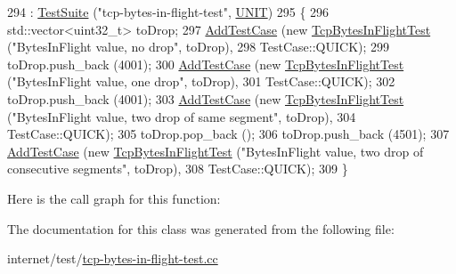 \begin{DoxyCode}
294                                : \hyperlink{classns3_1_1TestSuite_a904b0c40583b744d30908aeb94636d1a}{TestSuite} (\textcolor{stringliteral}{"tcp-bytes-in-flight-test"}, 
      \hyperlink{classns3_1_1TestSuite_a1ebfcab34ec8161e085e8e3a1855eae0a3885375a3787abf60431f8454b3cadbd}{UNIT})
295   \{
296     std::vector<uint32\_t> toDrop;
297     \hyperlink{classns3_1_1TestCase_a3718088e3eefd5d6454569d2e0ddd835}{AddTestCase} (\textcolor{keyword}{new} \hyperlink{classTcpBytesInFlightTest}{TcpBytesInFlightTest} (\textcolor{stringliteral}{"BytesInFlight value, no drop"}, 
      toDrop),
298                  TestCase::QUICK);
299     toDrop.push\_back (4001);
300     \hyperlink{classns3_1_1TestCase_a3718088e3eefd5d6454569d2e0ddd835}{AddTestCase} (\textcolor{keyword}{new} \hyperlink{classTcpBytesInFlightTest}{TcpBytesInFlightTest} (\textcolor{stringliteral}{"BytesInFlight value, one drop"}, 
      toDrop),
301                  TestCase::QUICK);
302     toDrop.push\_back (4001);
303     \hyperlink{classns3_1_1TestCase_a3718088e3eefd5d6454569d2e0ddd835}{AddTestCase} (\textcolor{keyword}{new} \hyperlink{classTcpBytesInFlightTest}{TcpBytesInFlightTest} (\textcolor{stringliteral}{"BytesInFlight value, two drop of
       same segment"}, toDrop),
304                  TestCase::QUICK);
305     toDrop.pop\_back ();
306     toDrop.push\_back (4501);
307     \hyperlink{classns3_1_1TestCase_a3718088e3eefd5d6454569d2e0ddd835}{AddTestCase} (\textcolor{keyword}{new} \hyperlink{classTcpBytesInFlightTest}{TcpBytesInFlightTest} (\textcolor{stringliteral}{"BytesInFlight value, two drop of
       consecutive segments"}, toDrop),
308                  TestCase::QUICK);
309   \}
\end{DoxyCode}


Here is the call graph for this function\+:




The documentation for this class was generated from the following file\+:\begin{DoxyCompactItemize}
\item 
internet/test/\hyperlink{tcp-bytes-in-flight-test_8cc}{tcp-\/bytes-\/in-\/flight-\/test.\+cc}\end{DoxyCompactItemize}
